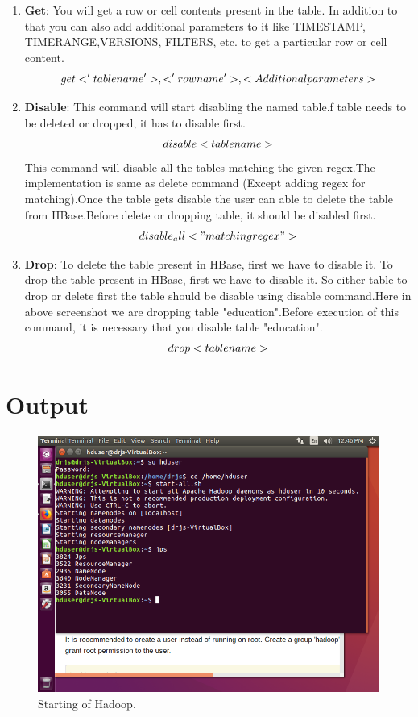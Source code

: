 \documentclass[a4paper,10pt]{article}
\begin{document}
\begin{enumerate}
		\item \textbf{Get}:
		You will get a row or cell contents present in the table. In addition to that you can also add additional parameters to it like TIMESTAMP, TIMERANGE,VERSIONS, FILTERS, etc. to get a particular row or cell content. 
			\begin{equation}
				 \boldmath get <'tablename'>, <'rowname'>, {< Additional parameters>}
			\end{equation}
		\item \textbf{Disable}:
			 This command will start disabling the named table.f table needs to be deleted or dropped, it has to disable first.
			\begin{equation}
				\boldmath disable <tablename> 
			\end{equation}
		This command will disable all the tables matching the given regex.The implementation is same as delete command (Except adding regex for matching).Once the table gets disable the user can able to delete the table from HBase.Before delete or dropping table, it should be disabled first.
		    \begin{equation}
				\boldmath disable_all<"matching regex"> 
			\end{equation}
		\item \textbf{Drop}:
		    To delete the table present in HBase, first we have to disable it.    To drop the table present in HBase, first we have to disable it. So either table to drop or delete first the table should be disable using disable command.Here in above screenshot we are dropping table "education".Before execution of this command, it is necessary that you disable table "education".
		    \begin{equation}
				\boldmath drop <table name>
			\end{equation}
\end{enumerate}

\section{Output}

\begin{figure}[h]
	\includegraphics[scale=0.33,center]{1.png}
	\caption{Starting of Hadoop.}
	\label{fig:02}
\end{figure}
\end{document}
